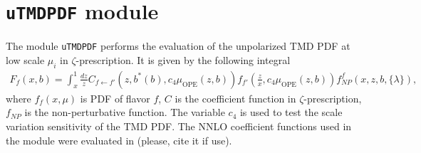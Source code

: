 \documentclass[prd,nofootinbib,eqsecnum,final]{revtex4}
\newcommand{\ot}{\leftarrow}
\renewcommand{\(}{\left(}
\renewcommand{\)}{\right)}
\renewcommand{\[}{\left[}
\renewcommand{\]}{\right]}
\begin{document}
\newpage
\section{\texttt{uTMDPDF} module}
\label{uTMDPDF}

The module \texttt{uTMDPDF} performs the evaluation of the unpolarized TMD PDF at low scale $\mu_i$ in $\zeta$-prescription. It is given by the following integral
\begin{eqnarray}\label{uTMDPDF:mainformula}
F_f(x,b)=\int_x^1 \frac{dz}{z}C_{f\ot f'}(z,b^*(b),c_4\mu_\text{OPE}(z,b))f_{f'}(\frac{z}{x},c_4\mu_\text{OPE}(z,b))f^f_{NP}(x,z,b,\{\lambda\}),
\end{eqnarray}
where $f_f(x,\mu)$ is PDF of flavor $f$, $C$ is the coefficient function in $\zeta$-prescription, $f_{NP}$ is the non-perturbative function. The variable $c_4$ is used to test the scale variation sensitivity of the TMD PDF. The NNLO coefficient functions used in the module were evaluated in \cite{Echevarria:2016scs} (please, cite it if use).
\end{document}
